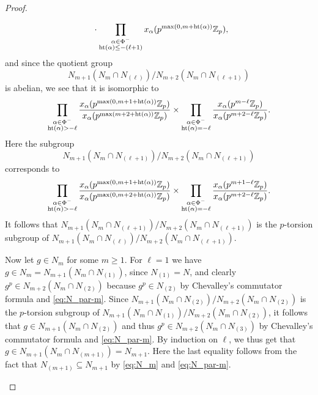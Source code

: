 \begin{proof}
\begin{enumerate}[(i),wide]
\begin{align*}
      &\phantom{{}={}} \cdot \prod_{\substack{\alpha \in \Phi^{-} \\ \Ht(\alpha) \leq -(\ell+1)}} x_\alpha(p^{\max(0,m+\Ht(\alpha))} \Z_p),
    \end{align*}
    and since the quotient group
    \begin{equation*}
      N_{m+1}(N_m \cap N_{(\ell)}) / N_{m+2}(N_m \cap N_{(\ell+1)})
    \end{equation*}
    is abelian, we see that it is isomorphic to
    \begin{equation*}
      \prod_{\substack{\alpha \in \Phi^{-} \\ \operatorname{ht}(\alpha) > -\ell}} \frac{x_\alpha(p^{\max(0,m+1+\operatorname{ht}(\alpha))} \mathbb{Z}_p)}{x_\alpha(p^{\max(m+2+\operatorname{ht}(\alpha))} \mathbb{Z}_p)} \times \prod_{\substack{\alpha \in \Phi^{-} \\ \operatorname{ht}(\alpha) = -\ell}} \frac{x_\alpha(p^{m-\ell} \mathbb{Z}_p)}{x_\alpha(p^{m+2-\ell} \mathbb{Z}_p)}.
    \end{equation*}
    Here the subgroup
    \begin{equation*}
      N_{m+1}(N_m \cap N_{(\ell+1)}) / N_{m+2}(N_m \cap N_{(\ell+1)})
    \end{equation*}
    corresponds to
    \begin{equation*}
      \prod_{\substack{\alpha \in \Phi^{-} \\ \operatorname{ht}(\alpha) > -\ell}} \frac{x_\alpha(p^{\max(0,m+1+\operatorname{ht}(\alpha))} \mathbb{Z}_p)}{x_\alpha(p^{\max(0,m+2+\operatorname{ht}(\alpha))} \mathbb{Z}_p)} \times \prod_{\substack{\alpha \in \Phi^{-} \\ \operatorname{ht}(\alpha) = -\ell}} \frac{x_\alpha(p^{m+1-\ell} \mathbb{Z}_p)}{x_\alpha(p^{m+2-\ell} \mathbb{Z}_p)}.
    \end{equation*}
    It follows that $N_{m+1}(N_m \cap N_{(\ell+1)}) / N_{m+2}(N_m \cap N_{(\ell+1)})$ is the $p$-torsion subgroup of $N_{m+1}(N_m \cap N_{(\ell)}) / N_{m+2}(N_m \cap N_{(\ell+1)})$.

    Now let $g\in N_m$ for some $m\geq1$. For $\ell = 1$ we have $g \in N_m = N_{m+1}(N_m \cap N_{(1)})$, since $N_{(1)} = N$, and clearly $g^p \in N_{m+2}(N_m \cap N_{(2)})$ because $g^{p} \in N_{(2)}$ by Chevalley's commutator formula and \eqref{eq:N_par-m}. Since $N_{m+1}(N_m \cap N_{(2)}) / N_{m+2}(N_m \cap N_{(2)})$ is the $p$-torsion subgroup of $N_{m+1}(N_m \cap N_{(1)}) / N_{m+2}(N_m \cap N_{(2)})$, it follows that $g \in N_{m+1}(N_m \cap N_{(2)})$ and thus $g^p \in N_{m+2}(N_m \cap N_{(3)})$ by Chevalley's commutator formula and \eqref{eq:N_par-m}. By induction on $\ell$, we thus get that $g \in N_{m+1}(N_m \cap N_{(m+1)}) = N_{m+1}$. Here the last equality follows from the fact that $N_{(m+1)} \subseteq N_{m+1}$ by \eqref{eq:N_m} and \eqref{eq:N_par-m}.
  \end{enumerate}
\end{proof}

